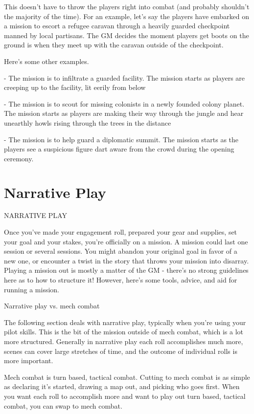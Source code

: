 This doesn’t have to throw the players right into combat (and probably shouldn’t the majority of  
the time). For an example, let’s say the players have embarked on a mission to escort a refugee  
caravan through a heavily guarded checkpoint manned by local partisans. The GM decides the  
moment players get boots on the ground is when they meet up with the caravan outside of the  
checkpoint.
 

Here’s some other examples.
 
         	- The mission is to infiltrate a guarded facility. The mission starts as players are creeping  
         up to the facility, lit eerily from below
 
         	- The mission is to scout for missing colonists in a newly founded colony planet. The  
         mission starts as players are making their way through the jungle and hear unearthly  
         howls rising through the trees in the distance
 
         	- The mission is to help guard a diplomatic summit. The mission starts as the players see  
         a suspicious figure dart aware from the crowd during the opening ceremony.

\chapter{Narrative Play}
                                  NARRATIVE PLAY
 

Once you’ve made your engagement roll, prepared your gear and supplies, set your goal and  
your stakes, you’re officially on a mission. A mission could last one session or several sessions.  
You might abandon your original goal in favor of a new one, or encounter a twist in the story that  
throws your mission into disarray. Playing a mission out is mostly a matter of the GM - there’s no  
strong guidelines here as to how to structure it! However, here’s some tools, advice, and aid for  
running a mission.  

                                      Narrative play vs. mech combat  

The following section deals with narrative play, typically when you’re using your pilot skills. This  
is the bit of the mission outside of mech combat, which is a lot more structured. Generally in  
narrative play each roll accomplishes much more, scenes can cover large stretches of time, and  
the outcome of individual rolls is more important.   

Mech combat is turn based, tactical combat. Cutting to mech combat is as simple as declaring  
it’s started, drawing a map out, and picking who goes first. When you want each roll to accomplish  
more and want to play out turn based, tactical combat, you can swap to mech combat.   

